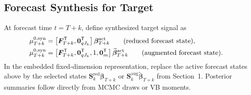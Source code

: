 \subsection{Forecast Synthesis for Target}
At forecast time $t=T+k$, define synthesized target signal as
\begin{align}
\mu_{T+k}^{0,\mathrm{syn}}
&=
\left[\bm F_{T+k}^{\mathsf{T}},\bm 0_{qJ_k}^{\mathsf{T}}\right]\bm\beta_{T+k}^{\mathrm{act}}
\qquad\text{(reduced forecast state)}, \label{eq:target_syn_red}\\
\mu_{T+k}^{0,\mathrm{syn}}
&=
\left[\bm F_{T+k}^{\mathsf{T}},\bm 0_{qJ_k}^{\mathsf{T}},1,\bm 0_m^{\mathsf{T}}\right]\widetilde{\bm\beta}_{T+k}^{\mathrm{act}}
\qquad\text{(augmented forecast state)}. \label{eq:target_syn_aug}
\end{align}
In the embedded fixed-dimension representation, replace the active forecast states above by the
selected states $\bm S_k^{\mathrm{red}}\bm\beta_{T+k}$ or
$\bm S_k^{\mathrm{aug}}\widetilde{\bm\beta}_{T+k}$ from Section~1.
Posterior summaries follow directly from MCMC draws or VB moments.
